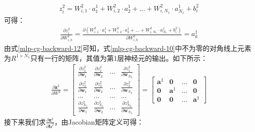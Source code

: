 \documentclass[UTF8]{article}
\begin{document}
\begin{equation}
\begin{aligned}
z^2_i=W^2_{i,1} \cdot a^1_1 + W^2_{i,2} \cdot a^1_2 + ... + W^2_{i,N_1} \cdot a^1_{N_1} + b^2_i
\end{aligned}
\label{mlp-cg-backward-11}
\end{equation}
可得：
\begin{equation}
\begin{aligned}
\frac{\partial{z^2_i}}{\partial{W^2_{i,k}}}=\frac{\partial{(W^2_{i,1} \cdot a^1_1 + W^2_{i,2} \cdot a^1_2 + ... + W^2_{i,N_1} \cdot a^1_{N_1} + b^2_i)}} {\partial{W^2_{i,k}}}=a^1_k
\end{aligned}
\label{mlp-cg-backward-12}
\end{equation}
由式\ref{mlp-cg-backward-12}可知，式\ref{mlp-cg-backward-10}中不为零的对角线上元素为$R^{1 \times {N_1}}$只有一行的矩阵，其值为第1层神经元的输出。如下所示：
\begin{equation}
\begin{aligned}
\frac{\partial{\boldsymbol{z}^2}}{\partial{W^2}}=\begin{bmatrix}
\frac{\partial{z^2_1}}{\partial{\boldsymbol{w}_1}} & \frac{\partial{z^2_1}}{\partial{\boldsymbol{w}_2}} & ... & \frac{\partial{z^2_1}}{\partial{\boldsymbol{w}_{N_2}}} \\
\frac{\partial{z^2_2}}{\partial{\boldsymbol{w}_1}} & \frac{\partial{z^2_2}}{\partial{\boldsymbol{w}_2}} & ... & \frac{\partial{z^2_2}}{\partial{\boldsymbol{w}_{N_2}}} \\
... & ... & ... & ... \\
\frac{\partial{z^2_{N_2}}}{\partial{\boldsymbol{w}_1}} & \frac{\partial{z^2_{N_2}}}{\partial{\boldsymbol{w}_2}} & ... & \frac{\partial{z^2_{N_2}}}{\partial{\boldsymbol{w}_{N_2}}}
\end{bmatrix}=\begin{bmatrix}
\boldsymbol{a}^1 & \boldsymbol{0} & ... & \boldsymbol{0} \\
\boldsymbol{0} & \boldsymbol{a}^1 & ... & \boldsymbol{0} \\
\boldsymbol{0} & \boldsymbol{0} & ... & \boldsymbol{a}^1
\end{bmatrix}
\end{aligned}
\label{mlp-cg-backward-13}
\end{equation}
接下来我们求$\frac{\partial{\boldsymbol{z}^2}}{\partial{\boldsymbol{b}^2}}$，由Jacobian矩阵定义可得：
\end{document}
